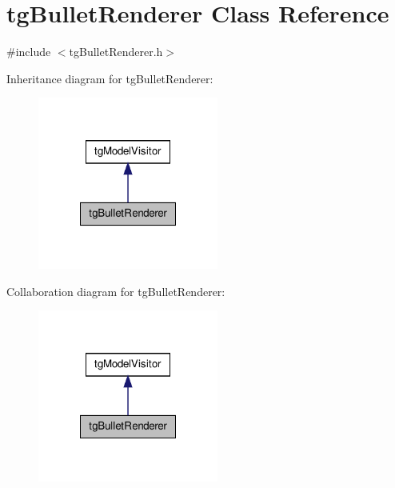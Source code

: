 \hypertarget{classtg_bullet_renderer}{\section{tg\-Bullet\-Renderer Class Reference}
\label{classtg_bullet_renderer}
}


{\ttfamily \#include $<$tg\-Bullet\-Renderer.\-h$>$}



Inheritance diagram for tg\-Bullet\-Renderer\-:\nopagebreak
\begin{figure}[H]
\begin{center}
\leavevmode
\includegraphics[width=168pt]{classtg_bullet_renderer__inherit__graph}
\end{center}
\end{figure}


Collaboration diagram for tg\-Bullet\-Renderer\-:\nopagebreak
\begin{figure}[H]
\begin{center}
\leavevmode
\includegraphics[width=168pt]{classtg_bullet_renderer__coll__graph}
\end{center}
\end{figure}
